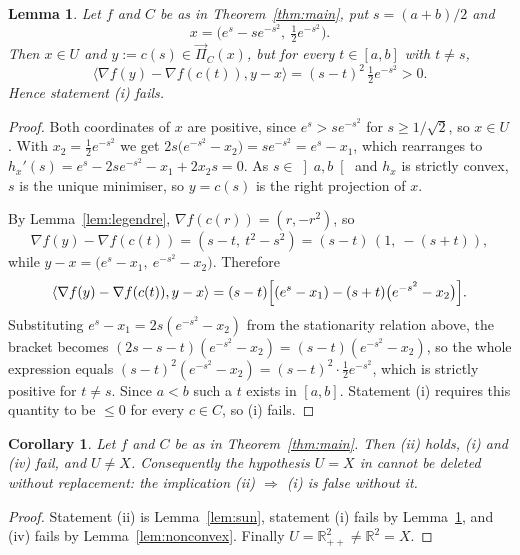 \documentclass[11pt]{amsart}
\theoremstyle{plain}
\newtheorem{lemma}[theorem]{Lemma}
\newtheorem{corollary}[theorem]{Corollary}
\theoremstyle{definition}
\theoremstyle{remark}
\newcommand{\R}{\mathbb{R}}
\newcommand{\Proj}{\overrightarrow{\Pi}}
\newcommand{\ip}[2]{\langle #1, #2 \rangle}
\begin{document}
\begin{lemma}\label{lem:i-fails}
Let $f$ and $C$ be as in Theorem~\textup{\ref{thm:main}}, put $s = (a+b)/2$ and
\[
  x = \bigl( e^{s} - s e^{-s^{2}},\ \tfrac{1}{2} e^{-s^{2}} \bigr) .
\]
Then $x \in U$ and $y := c(s) \in \Proj_{C}(x)$, but for every $t \in [a,b]$ with
$t \neq s$,
\[
  \ip{\nabla f(y) - \nabla f(c(t))}{y - x} = (s-t)^{2}\, \tfrac{1}{2} e^{-s^{2}} > 0 .
\]
Hence statement \textup{(i)} fails.
\end{lemma}

\begin{proof}
Both coordinates of $x$ are positive, since $e^{s} > s e^{-s^{2}}$ for
$s \ge 1/\sqrt2$, so $x \in U$. With $x_{2} = \tfrac12 e^{-s^{2}}$ we get
$2s\bigl( e^{-s^{2}} - x_{2} \bigr) = s e^{-s^{2}} = e^{s} - x_{1}$, which
rearranges to $h_{x}'(s) = e^{s} - 2s e^{-s^{2}} - x_{1} + 2 x_{2} s = 0$. As
$s \in \left]a,b\right[$ and $h_{x}$ is strictly convex, $s$ is the unique
minimiser, so $y = c(s)$ is the right projection of $x$.

By Lemma~\ref{lem:legendre}, $\nabla f(c(r)) = (r, -r^{2})$, so
\[
  \nabla f(y) - \nabla f(c(t)) = (s - t,\ t^{2} - s^{2}) = (s-t)\,(1,\ -(s+t)),
\]
while $y - x = \bigl( e^{s} - x_{1},\ e^{-s^{2}} - x_{2} \bigr)$. Therefore
\[
  \ip{\nabla f(y) - \nabla f(c(t))}{y - x}
  = (s-t) \Bigl[ (e^{s} - x_{1}) - (s+t)\bigl( e^{-s^{2}} - x_{2} \bigr) \Bigr].
\]
Substituting $e^{s} - x_{1} = 2s( e^{-s^{2}} - x_{2})$ from the stationarity
relation above, the bracket becomes
$(2s - s - t)( e^{-s^{2}} - x_{2}) = (s-t)( e^{-s^{2}} - x_{2})$, so the whole
expression equals $(s-t)^{2}( e^{-s^{2}} - x_{2}) = (s-t)^{2} \cdot
\tfrac12 e^{-s^{2}}$, which is strictly positive for $t \neq s$. Since $a < b$
such a $t$ exists in $[a,b]$. Statement (i) requires this quantity to be
$\le 0$ for every $c \in C$, so (i) fails.
\end{proof}

\begin{corollary}\label{cor:luo}
Let $f$ and $C$ be as in Theorem~\textup{\ref{thm:main}}. Then \textup{(ii)}
holds, \textup{(i)} and \textup{(iv)} fail, and $U \neq X$. Consequently the
hypothesis $U = X$ in \textup{\cite[Theorem 3.12(2)]{LMWY2019}} cannot be
deleted without replacement: the implication \textup{(ii)} $\Rightarrow$
\textup{(i)} is false without it.
\end{corollary}

\begin{proof}
Statement (ii) is Lemma~\ref{lem:sun}, statement (i) fails by
Lemma~\ref{lem:i-fails}, and (iv) fails by Lemma~\ref{lem:nonconvex}. Finally
$U = \R^{2}_{++} \neq \R^{2} = X$.
\end{proof}
\end{document}
